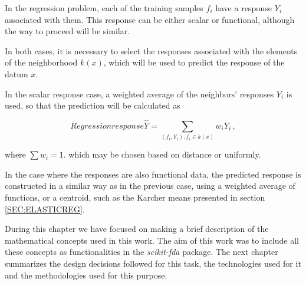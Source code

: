 In the regression problem, each of the training samples $f_i$ have a
response $Y_i$ associated with them. This response can be either scalar or
functional, although the way to proceed will be similar.

In both cases, it is necessary to select the responses associated with the
elements of the neighborhood $k(x)$, which will be used to predict the response
of the datum $x$.

In the scalar response case, a weighted average of the neighbors’ responses
$Y_i$ is used, so that the prediction will be calculated as

\begin{equation}{Regression response}
\hat Y = \sum_{(f_i, Y_i) : f_i \in k(x)} w_i Y_i \, ,
\end{equation}

where $\sum w_i = 1$.
which may be chosen based on distance or uniformly.

In the case where the responses are also functional data,
the predicted response is constructed in a similar way as in the previous
case, using a weighted average of functions, or a centroid, such as the
Karcher means presented in section \ref{SEC:ELASTICREG}.

During this chapter we have focused on making a brief description of the
mathematical concepts used in this work. The aim of this work was to include
all these concepts as functionalities in the \textit{scikit-fda} package.
The next chapter summarizes the design decisions followed for
this task, the technologies used for it and the methodologies used for this purpose.
